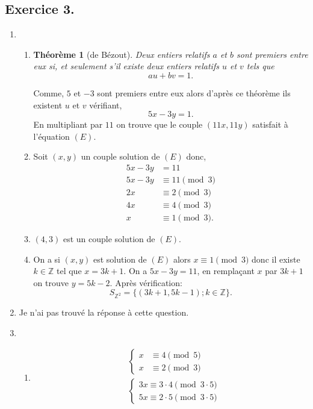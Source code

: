 \documentclass{article}
\newtheorem*{theorem}{Théorème}
\begin{document}
\subsection*{Exercice 3.}
	\begin{enumerate}
		\item \begin{enumerate}[label=(\alph*)]
			\item \begin{theorem}[de Bézout]
			Deux entiers relatifs $a$ et $b$ sont premiers entre eux si, et seulement s'il existe deux entiers relatifs $u$ et $v$ tels que $$au + bv = 1.$$
		\end{theorem}
		Comme, $5$ et $-3$ sont premiers entre eux alors d'après ce théorème ils existent $u$ et $v$ vérifiant, $$5x-3y=1.$$
		En multipliant par $11$ on trouve que le couple $(11x,11y)$ satisfait à l'équation $(E)$.
		\item Soit $(x,y)$ un couple solution de $(E)$ donc,\begin{align*}
			5x-3y&=11\\
			5x-3y&\equiv11\pmod{3}\\
			2x&\equiv2\pmod{3}\\
			4x&\equiv4\pmod{3}\\
			x&\equiv1\pmod{3}.
		\end{align*}
		\item $(4,3)$ est un couple solution de $(E)$.\\
		\item  On a si $(x,y)$ est solution de $(E)$ alors $x\equiv1\pmod{3}$ donc il existe $k\in\mathbb{Z}$ tel que $x=3k+1$. On a $5x-3y=11$, en remplaçant $x$ par $3k+1$ on trouve $y=5k-2$. Après vérification:
		$$S_{\mathbb{Z}^2}=\{(3k+1,5k-1);k\in\mathbb{Z}\}.$$
		\end{enumerate}
	\item Je n'ai pas trouvé la réponse à cette question.
	\item \begin{enumerate}[label=(\alph*)]
		\item \begin{align*}
			&\begin{cases}
				x &\equiv4 \pmod5\\
				x &\equiv2 \pmod3
			\end{cases}\\
			&\begin{cases}
				3x \equiv 3\cdot4\pmod{3\cdot5}\\
				5x \equiv 2\cdot5\pmod{3\cdot5}
			\end{cases}\\

\end{align*}
\end{enumerate}
\end{enumerate}
\end{document}

